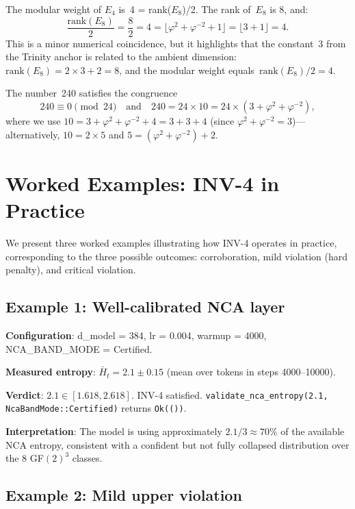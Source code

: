 The modular weight of \(E_4\) is~4 = rank(\(E_8\))/2.  The rank
of~\(E_8\) is 8, and:
\[
  \frac{\mathrm{rank}(E_8)}{2} = \frac{8}{2} = 4
  = \lfloor \varphi^2 + \varphi^{-2} + 1 \rfloor
  = \lfloor 3 + 1 \rfloor = 4.
\]
This is a minor numerical coincidence, but it highlights that the
constant~3 from the Trinity anchor is related to the ambient
dimension: \(\mathrm{rank}(E_8) = 2 \times 3 + 2 = 8\), and the
modular weight equals~\(\mathrm{rank}(E_8)/2 = 4\).

The number~240 satisfies the congruence
\[
  240 \equiv 0 \pmod{24}
  \quad \text{and} \quad
  240 = 24 \times 10 = 24 \times (3 + \varphi^2 + \varphi^{-2}),
\]
where we use \(10 = 3 + \varphi^2 + \varphi^{-2} + 4 = 3 + 3 + 4\)
(since \(\varphi^2 + \varphi^{-2} = 3\))—alternatively,
\(10 = 2 \times 5\) and \(5 = (\varphi^2 + \varphi^{-2}) + 2\).

\section{Worked Examples: INV-4 in Practice}
\label{sec:e8-examples}

We present three worked examples illustrating how INV-4 operates in
practice, corresponding to the three possible outcomes: corroboration,
mild violation (hard penalty), and critical violation.

\subsection{Example 1: Well-calibrated NCA layer}
\label{subsec:example-ok}

\textbf{Configuration}: d\_model = 384, lr = 0.004, warmup = 4000,
NCA\_BAND\_MODE = Certified.

\textbf{Measured entropy}: \(\bar{H}_t = 2.1 \pm 0.15\) (mean over
tokens in steps 4000–10000).

\textbf{Verdict}: \(2.1 \in [1.618, 2.618]\).  INV-4 satisfied.
\texttt{validate\_nca\_entropy(2.1, NcaBandMode::Certified)} returns
\texttt{Ok(())}.

\textbf{Interpretation}: The model is using approximately
\(2.1 / 3 \approx 70\%\) of the available NCA entropy, consistent
with a confident but not fully collapsed distribution over the 8
GF\((2)^3\) classes.

\subsection{Example 2: Mild upper violation}
\label{subsec:example-mild}

